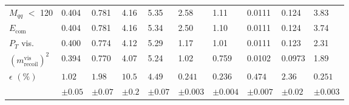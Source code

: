 \begin{table}
\begin{tabular}{|p{}|p{}p{}p{}|p{}|p{}p{}p{}p{}|p{}|}
$M_{qq}$ $<$ 120 & {0.404 } &  {0.781 } &  {4.16} & {5.35} &  {2.58} &  {1.11} &  {0.0111} &  {0.124} & 3.83\\ 
 
$E_{\text{com}}$ & {0.404 } &  {0.781 } &  {4.16} & {5.34} &  {2.50} &  {1.10} &  {0.0111} &  {0.124} &3.74\\ 

$P_T$ vis. & {0.400 } &  {0.774 } &  {4.12} & {5.29} &  {1.17} &  {1.01} &  {0.0111} &  {0.123} &2.31\\ 
 
$(m^{\text{vis}}_{\text{recoil}})^2$ & {0.394 } &  {0.770 } &  {4.07} & {5.24} &  {1.02} &  {0.759} &  {0.0102} &  {0.0973}& 1.89 \\ 
\hline 
 $\epsilon \, \, (\%)$ & $1.02 $ & $1.98 $ & $10.5 $ &  $4.49 $ & $0.241 $ & $0.236 $ & $0.474 $ & $2.36 $ & $0.251$\\ 

  	     & $\pm 0.05$ & $\pm 0.07$ & $\pm 0.2$ & $\pm 0.07$ & $\pm 0.003$ & $\pm 0.004$ & $\pm 0.007$ & $\pm 0.02$ & $\pm 0.003$ \\

 \hline
 \end{tabular}
 

\end{table}


